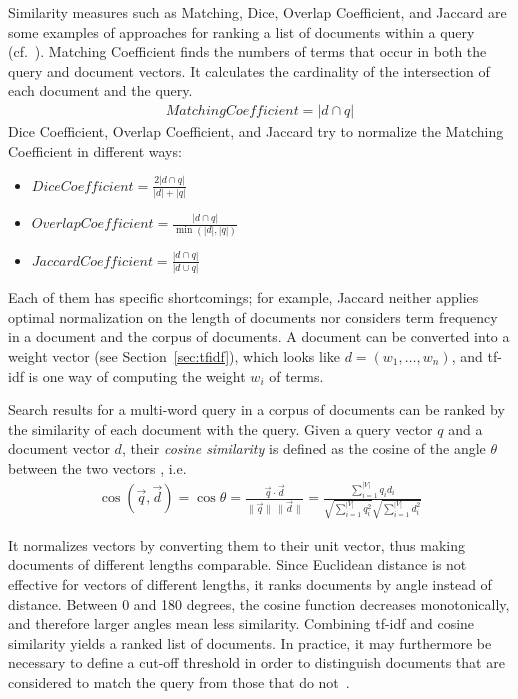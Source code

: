 \documentclass{IOS-Book-Article}
\begin{document}
Similarity measures such as Matching, Dice, Overlap Coefficient, and Jaccard are some examples of approaches for ranking a list of documents within a query (cf.~\citet{ChristopherD1999}).
Matching Coefficient finds the numbers of terms that occur in both the query and document vectors.
It calculates the cardinality of the intersection of each document and the query.
\begin{align*}
\mathit{Matching Coefficient}=|d\cap q|
\end{align*}
Dice Coefficient, Overlap Coefficient, and Jaccard try to normalize the Matching Coefficient in different ways:
\begin{itemize}
	\item $\mathit{Dice Coefficient}=\frac{2|d\cap q|}{|d|+|q|}$
	\item $\mathit{Overlap Coefficient}=\frac{|d\cap q|}{\min(|d|,|q|)}$
	\item $\mathit{Jaccard Coefficient}=\frac{|d\cap q|}{|d\cup q|}$
\end{itemize}
Each of them has specific shortcomings;
for example, Jaccard neither applies optimal normalization on the length of documents nor considers term frequency in a document and the corpus of documents.
A document can be converted into a weight vector (see Section~\ref{sec:tfidf}), which looks like $d=(w_1,\dots,w_n)$, and tf-idf is one way of computing the weight $w_i$ of terms.

Search results for a multi-word query in a corpus of documents can be ranked by the similarity of each document with the query.
Given a query vector $q$ and a document vector $d$, their \emph{cosine similarity} is defined as the cosine of the angle $\theta$ between the two vectors \citep{SALTON1988,ChristopherD1999}, i.e.\
\begin{align*}
  \cos(\overrightarrow{q},\overrightarrow{d})=\cos \theta=\frac{\overrightarrow{q}\cdot \overrightarrow{d}}{\|\overrightarrow{q}\|\,\|\overrightarrow{d}\|}=
  \frac{\sum_{i=1}^{|V|} q_id_i}{\sqrt{\sum_{i=1}^{|V|} q_i^2}\sqrt{\sum_{i=1}^{|V|} d_i^2}}
\end{align*}

It normalizes vectors by converting them to their unit vector, thus making documents of different lengths comparable.
Since Euclidean distance is not effective for vectors of different lengths, it ranks documents by angle instead of distance.
Between 0 and 180 degrees, the cosine function decreases monotonically, and therefore larger angles mean less similarity.
Combining tf-idf and cosine similarity yields a ranked list of documents.
In practice, it may furthermore be necessary to define a cut-off threshold in order to distinguish documents that are considered to match the query from those that do not~\citep{Joachims1997}.
\end{document}
